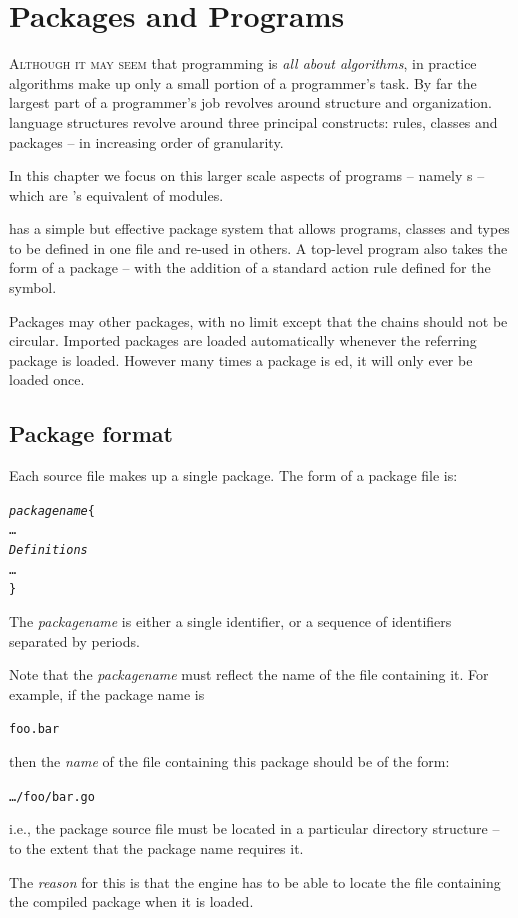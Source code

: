 \chapter{Packages and Programs}
\label{package}

\lettrine[nindent=0.1em]{A}{lthough it may seem} that programming is \emph{all about algorithms}, in practice algorithms make up only a small portion of a programmer's task. By far the largest part of a programmer's job revolves around structure and organization. \go language structures revolve around three principal constructs: rules, classes and packages -- in increasing order of granularity. 

In this chapter we focus on this larger scale aspects of \go programs -- namely s -- which are \go's equivalent of modules.

\go has a simple but effective package system that allows programs, classes and types to be defined in one file and re-used in others. A top-level program also takes the form of a package -- with the addition of a standard action rule defined for the  symbol.

Packages may  other packages, with no limit except that the  chains should not be circular. Imported packages are loaded automatically whenever the referring package is loaded. However many times a package is ed, it will only ever be loaded once.

\section{Package format}
\label{package:format}
Each \go source file makes up a single package. The form of a package file is:
\begin{alltt}
\emph{packagename}\{
  \ldots
  \emph{Definitions}
  \ldots
\}
\end{alltt}
The \emph{packagename} is either a single identifier, or a sequence of identifiers separated by periods.

Note that the \emph{packagename} must reflect the name of the file containing it. For example, if the package name is 
\begin{alltt}
foo.bar
\end{alltt}
then the \emph{name} of the file containing this package should be of the form:
\begin{alltt}
\ldots/foo/bar.go
\end{alltt}
i.e., the package source file must be located in a particular directory structure -- to the extent that the package name requires it.
\begin{aside}
The \emph{reason} for this is that the \go engine has to be able to locate the file containing the compiled package when it is loaded.
\end{aside}

